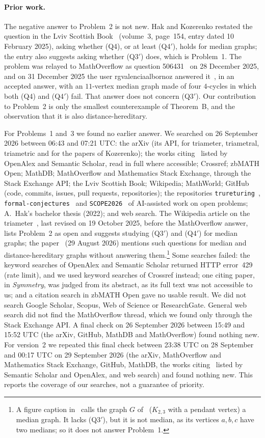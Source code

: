 \documentclass[11pt]{article}
\theoremstyle{remark}
\newcommand{\QAp}{\textup{(Q3$'$)}}
\newcommand{\QB}{\textup{(Q4)}}
\newcommand{\QBp}{\textup{(Q4$'$)}}
\begin{document}
\paragraph{Prior work.}
The negative answer to Problem~2 is not new. Hak and Kozerenko restated the
question in the Lviv Scottish Book~\cite{lsb} (volume~3, page~154, entry dated
10 February 2025), asking whether \QB, or at least \QBp, holds for median
graphs; the entry also suggests asking whether \QAp{} does, which is
Problem~1. The problem was relayed to MathOverflow as question
506431~\cite{mo-q} on 28 December 2025, and on 31 December 2025 the user
rgvalenciaalbornoz answered it~\cite{mo-a}, in an accepted answer, with an
$11$-vertex median graph made of four $4$-cycles in which both \QB{} and \QBp{}
fail. That answer does not concern \QAp. Our contribution to Problem~2 is only
the smallest counterexample of Theorem~B, and the observation that it is also
distance-hereditary.

For Problems~1 and~3 we found no earlier answer. We searched on 26 September
2026 between 06:43 and 07:21 UTC: the arXiv (its API, for triameter,
triametral, triametric and for the papers of Kozerenko); the works
citing~\cite{hko} listed by OpenAlex and Semantic Scholar, read in full where
accessible; Crossref; zbMATH Open; MathDB; MathOverflow and Mathematics Stack
Exchange, through the Stack Exchange API; the Lviv Scottish Book; Wikipedia;
MathWorld; GitHub (code, commits, issues, pull requests, repositories); the
repositories \texttt{trureturing}~\cite{tru},
\texttt{formal-conjectures}~\cite{fc} and \texttt{SCOPE2026}~\cite{scope} of
AI-assisted work on open problems; A.~Hak's bachelor thesis (2022); and web
search. The Wikipedia article on the triameter~\cite{wiki}, last
revised on 19 October 2025, before the MathOverflow answer, lists Problem~2 as
open and suggests studying \QAp{} and \QBp{} for median graphs; the
paper~\cite{koz} (29 August 2026) mentions such questions for median and
distance-hereditary graphs without answering them.\footnote{\label{fn:wiki}A figure caption in~\cite{wiki} calls the graph $G$
of~\cite[Figure~3]{hko} ($K_{2,3}$ with a pendant vertex) a median graph. It
lacks \QAp, but it is not median, as its vertices $a,b,c$ have two medians; so
it does not answer Problem~1.} Some searches
failed: the keyword searches of OpenAlex and Semantic Scholar returned HTTP
error~429 (rate limit), and we used keyword searches of Crossref instead; one
citing paper, in \emph{Symmetry}, was judged from its abstract, as its full
text was not accessible to us; and a citation search in zbMATH Open gave no
usable result. We did not search Google Scholar, Scopus, Web of Science
or ResearchGate. General web search did not find the MathOverflow thread, which
we found only through the Stack Exchange API. A final check on 26 September
2026 between 15:49 and 15:52 UTC (the arXiv, GitHub, MathDB and MathOverflow)
found nothing new.
For version~2 we repeated this final check between 23:38 UTC on 28 September
and 00:17 UTC on 29 September 2026 (the arXiv, MathOverflow and Mathematics
Stack Exchange, GitHub, MathDB, the works citing~\cite{hko} listed by
Semantic Scholar and OpenAlex, and web search) and found nothing new. This
reports the coverage of our searches, not a guarantee of priority.
\end{document}
